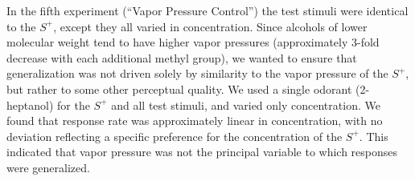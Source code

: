 In the fifth experiment (``Vapor Pressure Control'') the test stimuli were identical to the $S^+$, except they all varied in concentration.  
Since alcohols of lower molecular weight tend to have higher vapor pressures (approximately 3-fold decrease with each additional methyl group), we wanted to ensure that generalization was not driven solely by similarity to the vapor pressure of the $S^+$, but rather to some other perceptual quality.  
We used a single odorant (2-heptanol) for the $S^+$ and all test stimuli, and varied only concentration.  
We found that response rate was approximately linear in concentration, with no deviation reflecting a specific preference for the concentration of the $S^+$.  
This indicated that vapor pressure was not the principal variable to which responses were generalized.  
